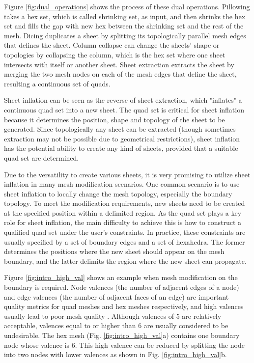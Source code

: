 \documentclass[final,5p,times,twocolumn]{elsarticle}
\begin{document}
Figure \ref{fig:dual_operations} shows the process of these dual operations. Pillowing takes a hex set, which is called shrinking set, as input, and then shrinks the hex set and fills the gap with new hex between the shrinking set and the rest of the mesh. Dicing duplicates a sheet by splitting its topologically parallel mesh edges that defines the sheet. Column collapse can change the sheets' shape or topologies by collapsing the column, which is the hex set where one sheet intersects with itself or another sheet. Sheet extraction extracts the sheet by merging the two mesh nodes on each of the mesh edges that define the sheet, resulting a continuous set of quads.

Sheet inflation can be seen as the reverse of sheet extraction, which "inflates" a continuous quad set into a new sheet. The quad set is critical for sheet inflation because it determines the position, shape and topology of the sheet to be generated. Since topologically any sheet can be extracted (though sometimes extraction may not be possible due to geometrical restrictions), sheet inflation has the potential ability to create any kind of sheets, provided that a suitable quad set are determined.

Due to the versatility to create various sheets, it is very promising to utilize sheet inflation in many mesh modification scenarios. One common scenario is to use sheet inflation to locally change the mesh topology, especially the boundary topology. To meet the modification requirements, new sheets need to be created at the specified position within a delimited region. As the quad set plays a key role for sheet inflation, the main difficulty to achieve this is how to construct a qualified quad set under the user's constraints. In practice, these constraints are usually specified by a set of boundary edges and a set of hexahedra. The former determines the positions where the new sheet should appear on the mesh boundary, and the latter delimits the region where the new sheet can propagate. 

Figure \ref{fig:intro_high_val} shows an example when mesh modification on the boundary is required. Node valences (the number of adjacent edges of a node) and edge valences (the number of adjacent faces of an edge) are important quality metrics for quad meshes and hex meshes respectively, and high valences usually lead to poor mesh quality  \cite{anderson2009automatic,canann1998topological,millerusing,Staten2010d}. Although valences of 5 are relatively acceptable, valences equal to or higher than 6 are usually considered to be undesirable. The hex mesh (Fig. \ref{fig:intro_high_val}a) contains one boundary node whose valence is 6. This high valence can be reduced by splitting the node into two nodes with lower valences as shown in Fig. \ref{fig:intro_high_val}b. 
\end{document}
